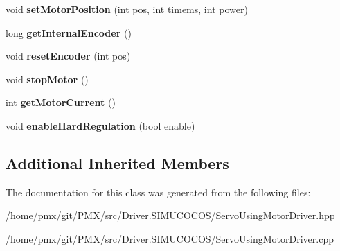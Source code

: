 \begin{DoxyCompactItemize}
\mbox{\label{classServoUsingMotorDriver_a9569643c48ac9d6c1936e8562825e280}} 
void {\bfseries set\+Motor\+Position} (int pos, int timems, int power)
\item 
\mbox{\label{classServoUsingMotorDriver_a64c62fd0ecb287fe45770c387e394eac}} 
long {\bfseries get\+Internal\+Encoder} ()
\item 
\mbox{\label{classServoUsingMotorDriver_acf78dbe83df0a7744fd40920a6388efd}} 
void {\bfseries reset\+Encoder} (int pos)
\item 
\mbox{\label{classServoUsingMotorDriver_a58fbf805d7bb382b505ea634e6bcbb08}} 
void {\bfseries stop\+Motor} ()
\item 
\mbox{\label{classServoUsingMotorDriver_ad76b35929d55c4249c5e7c3818c053b6}} 
int {\bfseries get\+Motor\+Current} ()
\item 
\mbox{\label{classServoUsingMotorDriver_adeb6e60d59bac919b7dc45c6f4a4f32c}} 
void {\bfseries enable\+Hard\+Regulation} (bool enable)
\end{DoxyCompactItemize}
\subsection*{Additional Inherited Members}


The documentation for this class was generated from the following files\+:\begin{DoxyCompactItemize}
\item 
/home/pmx/git/\+P\+M\+X/src/\+Driver.\+S\+I\+M\+U\+C\+O\+C\+O\+S/Servo\+Using\+Motor\+Driver.\+hpp\item 
/home/pmx/git/\+P\+M\+X/src/\+Driver.\+S\+I\+M\+U\+C\+O\+C\+O\+S/Servo\+Using\+Motor\+Driver.\+cpp\end{DoxyCompactItemize}
